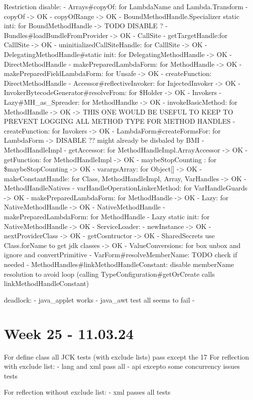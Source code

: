 Restriction disable:
- Arrays#copyOf: for LambdaName and Lambda.Transform
    - copyOf -> OK
    - copyOfRange -> OK
- BoundMethodHandle.Specializer static inti: for BoundMethodHandle -> TODO DISABLE ?
- Bundles#loadBundleFromProvider -> OK
- CallSite
    - getTargetHandle:for CalllSite -> OK
    - uninitializedCallSiteHandle: for CalllSite -> OK
- DelegatingMethodHandle#static init: for DelegatingMethodHandle -> OK
- DirectMethodHandle
    - makePreparedLambdaForm: for MethodHandle -> OK
    - makePreparedFieldLambdaForm: for Unsafe -> OK
    - createFunction: DirectMethodHandle
    - Accessor#reflectiveInvoker: for InjectedInvoker -> OK
- InvokerBytecodeGenerator#resolveFrom: for \$Holder -> OK
- Invokers
    - Lazy#MH_as_Spreader: for MethodHandke -> OK
    - invokeBasicMethod: for MethodHandle -> OK -> THIS ONE WOULD BE USEFUL TO KEEP TO PREVENT LOGGING ALL METHOD TYPE FOR METHOD HANDLES
    - createFunction: for Invokers -> OK
- LambdaForm#createFormsFor: for LambdaForm -> DISABLE ?? might already be disbaled by BMI    
- MethodHandleImpl
    - getAccessor: for MethodHandleImpl.ArrayAccessor -> OK
    - getFunction: for MethodHandleImpl -> OK
    - maybeStopCounting : for \$maybeStopCounting -> OK
    - varargsArray: for Object[] -> OK
    - makeConstantHandle: for Class, MethodHandleImpl, Array, VarHandles -> OK
- MethodHandleNatives
    - varHandleOperationLinkerMethod: for VarHandleGuards -> OK
    - makePreparedLambdaForm: for MethodHandle -> OK
    - Lazy: for NativeMethodHandle -> OK
- NativeMethodHandle
    - makePreparedLambdaForm: for MethodHandle
    - Lazy static init: for NativeMethodHandle -> OK
- ServiceLoader: 
    - newInstance -> OK
    - nextProviderClass -> OK
    - getCosntructor -> OK
- SharedSecrets use Class.forName to get jdk classes -> OK
- ValueConversions: for box unbox and ignore and convertPrimitive
- VarForm#resolveMemberName: TODO check if needed
- MethodHandles#linkMethodHandleConstant: disable memberName resolution to avoid loop (calling TypeConfiguration#getOrCreate calls linkMethodHandleConstant)


deadlock:
- java_applet works
- java_awt test all seems to fail
-

\section{Week 25 - 11.03.24}

For define class all JCK tests (with exclude lists) pass except the 17
For reflection with exclude list:
- lang and xml pass all 
- api excepto some concurrency issues tests

For reflection without exclude list:
- xml passes all tests
